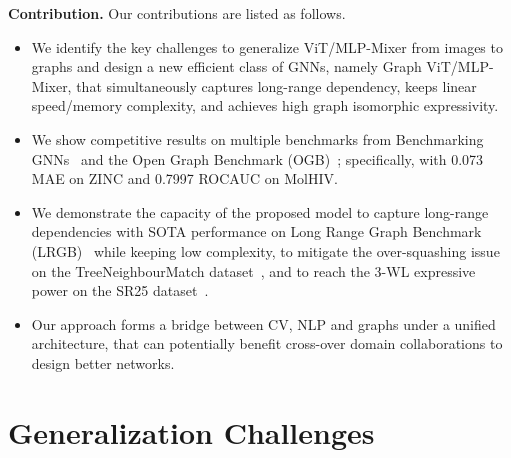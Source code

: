 \documentclass{article}
\begin{document}
\textbf{Contribution.} 
Our contributions are listed as follows. 
\begin{itemize}
\item We identify the key challenges to generalize ViT/MLP-Mixer from images to graphs and design a new efficient class of GNNs, namely Graph ViT/MLP-Mixer, that simultaneously captures long-range dependency, keeps linear speed/memory complexity, and achieves high graph isomorphic expressivity.
    \item We show competitive results on multiple benchmarks from Benchmarking GNNs~\citep{dwivedi2020benchmarking} and the Open Graph Benchmark (OGB)~\citep{hu2020open}; specifically, with 0.073 MAE on ZINC and 0.7997 ROCAUC on MolHIV.
     \item We demonstrate the capacity of the proposed model to capture long-range dependencies with SOTA performance on Long Range Graph Benchmark (LRGB)~\citep{dwivedi2022long} while keeping low complexity,  to mitigate the over-squashing issue on the TreeNeighbourMatch dataset~\citep{alon2020bottleneck}, and to reach the 3-WL expressive power on the SR25 dataset~\citep{balcilar2021breaking}. 
    \item Our approach forms a bridge between CV, NLP and graphs under a unified architecture, that can potentially benefit cross-over domain collaborations to design better networks.
\end{itemize}



\section{Generalization Challenges}\label{sec: challenges}
\end{document}
